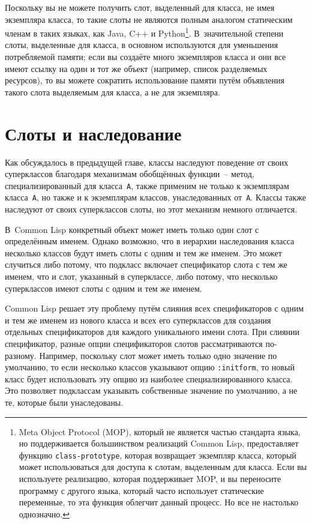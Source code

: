 Поскольку вы не можете получить слот, выделенный для класса, не имея экземпляра класса, то
такие слоты не являются полным аналогом статическим членам в таких языках, как Java, C++ и
Python\footnote{Meta Object Protocol (MOP), который не является частью стандарта языка,
  но поддерживается большинством реализаций Common Lisp, предоставляет функцию
  \lstinline{class-prototype}, которая возвращает экземпляр класса, который может
  использоваться для доступа к слотам, выделенным для класса.  Если вы используете
  реализацию, которая поддерживает MOP, и вы переносите программу с другого языка, который
  часто использует статические переменные, то эта функция облегчит данный процесс.  Но все
  не настолько однозначно.}\hspace{\footnotenegspace}.  В~значительной степени слоты, выделенные для класса, в
основном используются для уменьшения потребляемой памяти; если вы создаёте много
экземпляров класса и они все имеют ссылку на один и тот же объект (например, список
разделяемых ресурсов), то вы можете сократить использование памяти путём объявления такого
слота выделяемым для класса, а не для экземпляра.

\section{Слоты и наследование}

Как обсуждалось в предыдущей главе, классы наследуют поведение от своих суперклассов
благодаря механизмам обобщённых функции~-- метод, специализированный для класса~\lstinline{A},
также применим не только к экземплярам класса~\lstinline{A}, но также и к экземплярам классов,
унаследованных от~\lstinline{A}.  Классы также наследуют от своих суперклассов слоты, но этот
механизм немного отличается.

В~Common Lisp конкретный объект может иметь только один слот с определённым именем.
Однако возможно, что в иерархии наследования класса несколько классов будут иметь слоты с
одним и тем же именем.  Это может случиться либо потому, что подкласс включает
спецификатор слота с тем же именем, что и слот, указанный в суперклассе, либо потому, что
несколько суперклассов имеют слоты с одним и тем же именем.

Common Lisp решает эту проблему путём слияния всех спецификаторов с одним и тем же именем
из нового класса и всех его суперклассов для создания отдельных спецификаторов для каждого
уникального имени слота.  При слиянии спецификатор, разные опции спецификаторов слотов
рассматриваются по-разному.  Например, поскольку слот может иметь только одно значение по
умолчанию, то если несколько классов указывают опцию \lstinline{:initform}, то новый класс
будет использовать эту опцию из наиболее специализированного класса.  Это позволяет
подклассам указывать собственные значение по умолчанию, а не те, которые были
унаследованы.

